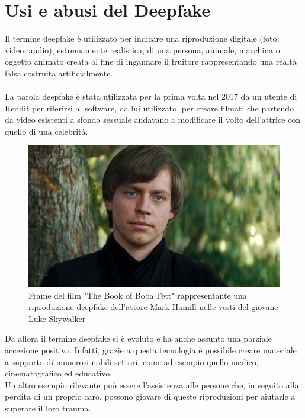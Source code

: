 \documentclass[12pt, a4paper]{article}
\begin{document}


\newpage
\section{Usi e abusi del Deepfake}
Il termine deepfake è utilizzato per indicare una riproduzione digitale (foto, video, audio), estremamente realistica, di una persona, animale, macchina o oggetto animato creata al fine di ingannare il fruitore rappresentando una realtà falsa costruita artificialmente.\\\\
La parola deepfake è stata utilizzata per la prima volta nel 2017 da un utente di Reddit per riferirsi al software, da lui utilizzato, per creare filmati che partendo da video esistenti a sfondo sessuale andavano a modificare il volto dell'attrice con quello di una celebrità\cite{OrigineDeepfake}. 
\\
\begin{figure}
\includegraphics[width=1\linewidth]{img/Luke}
\caption{Frame del film "The Book of Boba Fett" rappresentante una riproduzione deepfake dell'attore Mark Hamill nelle vesti del giovane Luke Skywalker}
\label{fig:wrapfig}
\end{figure}
Da allora il termine deepfake si è evoluto e ha anche assunto una parziale accezione positiva. Infatti, grazie a questa tecnologia è possibile creare materiale a supporto di numerosi nobili settori, come ad esempio quello medico, cinematografico ed educativo.\cite{LukeDeepfake}\\
Un altro esempio rilevante può essere l'assistenza alle persone che, in seguito alla perdita di un proprio caro, possono giovare di queste riproduzioni per aiutarle a superare il loro trauma\cite{SuperareTrauma}.
\end{document}
